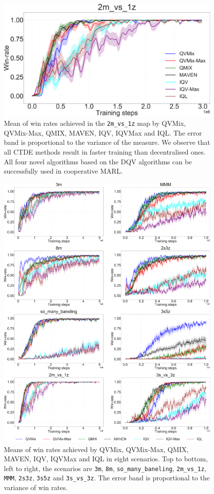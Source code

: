 \begin{figure}
\centering
\includegraphics[width=.7\linewidth]{tex_thesis/figures/ch4/2m1zall.pdf}
\caption{Mean of win rates achieved in the \texttt{2m\_vs\_1z} map by QVMix, QVMix-Max, QMIX, MAVEN, IQV, IQVMax and IQL. The error band is proportional to the variance of the measure. We observe that all CTDE methods result in faster training than decentralised ones. All four novel algorithms based on the DQV algorithms can be successfully used in cooperative MARL.}
\label{fig:ch4_2m1zwin}
\end{figure}

\begin{figure}
\centering
\includegraphics[width=.95\linewidth]{tex_thesis/figures/ch4/all_win.pdf}
\caption{Means of win rates achieved by QVMix, QVMix-Max, QMIX, MAVEN, IQV, IQVMax and IQL in eight scenarios. Top to bottom, left to right, the scenarios are \texttt{3m}, \texttt{8m}, \texttt{so\_many\_baneling}, \texttt{2m\_vs\_1z}, \texttt{MMM}, \texttt{2s3z}, \texttt{3s5z} and \texttt{3s\_vs\_3z}. The error band is proportional to the variance of win rates.}
\label{fig:all_win_curves}
\end{figure}

